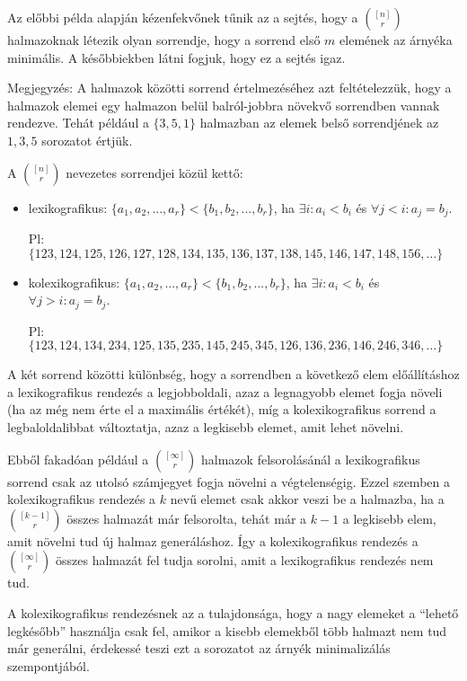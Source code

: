 \begin{obs}
  Az előbbi példa alapján kézenfekvőnek tűnik az a sejtés, hogy a $\binom{[n]}{r}$ halmazoknak létezik olyan sorrendje, hogy a sorrend első $m$ elemének az árnyéka minimális. A későbbiekben látni fogjuk, hogy ez a sejtés igaz.
\end{obs}

Megjegyzés: A halmazok közötti sorrend értelmezéséhez azt feltételezzük, hogy a halmazok elemei egy halmazon belül balról-jobbra növekvő sorrendben vannak rendezve. Tehát például a $\{3, 5, 1\}$ halmazban az elemek belső sorrendjének az $1, 3, 5$ sorozatot értjük.

\vspace{1em}

\noindent A $\binom{[n]}{r}$ nevezetes sorrendjei közül kettő:
\begin{itemize}
  \item lexikografikus:\hphantom{ko} $\{a_1, a_2, ..., a_r\} < \{b_1, b_2, ..., b_r\}$, ha $\exists i: a_i < b_i$ és $\forall j < i: a_j = b_j$.

  Pl: $\{123, 124, 125, 126, 127, 128, 134, 135, 136, 137, 138, 145, 146, 147, 148, 156, \dots\}$

  \item kolexikografikus: $\{a_1, a_2, ..., a_r\} < \{b_1, b_2, ..., b_r\}$, ha $\exists i: a_i < b_i$ és $\forall j > i: a_j = b_j$.

  Pl: $\{123, 124, 134, 234, 125, 135, 235, 145, 245, 345, 126, 136, 236, 146, 246, 346, \dots\}$
\end{itemize}

A két sorrend közötti különbség, hogy a sorrendben a következő elem előállításhoz a lexikografikus rendezés a legjobboldali, azaz a legnagyobb elemet fogja növeli (ha az még nem érte el a maximális értékét), míg a kolexikografikus sorrend a legbaloldalibbat változtatja, azaz a legkisebb elemet, amit lehet növelni.

Ebből fakadóan például a $\binom{[\infty]}{r}$ halmazok felsorolásánál a lexikografikus sorrend csak az utolsó számjegyet fogja növelni a végtelenségig. Ezzel szemben a kolexikografikus rendezés a $k$ nevű elemet csak akkor veszi be a halmazba, ha a $\binom{[k-1]}{r}$ összes halmazát már felsorolta, tehát már a $k-1$ a legkisebb elem, amit növelni tud új halmaz generáláshoz. Így a kolexikografikus rendezés a $\binom{[\infty]}{r}$ összes halmazát fel tudja sorolni, amit a lexikografikus rendezés nem tud.

A kolexikografikus rendezésnek az a tulajdonsága, hogy a nagy elemeket a ``lehető legkésőbb'' használja csak fel, amikor a kisebb elemekből több halmazt nem tud már generálni, érdekessé teszi ezt a sorozatot az árnyék minimalizálás szempontjából.
